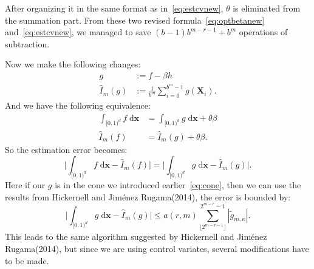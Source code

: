 After organizing it in the same format as in~\eqref{eq:estcvnew}, $\theta$ is eliminated from the summation part. 
From these two revised formula~\eqref{eq:optbetanew} and~\eqref{eq:estcvnew}, we managed to save $(b-1)b^{m-r-1}+b^m$ operations of subtraction.



Now we make the following changes:
\begin{align*}
    g&:=f-\beta h\\ 
    \hat{I}_m({g})&:= \frac{1}{b^m}\sum_{i=0}^{b^m-1}g(\mathbf{X}_i).
\end{align*}
And we have the following equivalence:
\begin{align*}
    \int_{[0,1)^d}f\;\textrm{d}\mathbf{x} &= \int_{[0,1)^d}g\;\textrm{d}\mathbf{x} +\theta\beta\\ 
    \hat{I}_m(f) &= \hat{I}_m(g)+\theta\beta.
\end{align*}
So the estimation error becomes:
\[
    \Big| \int_{[0,1)^d}f\;\textrm{d}\mathbf{x}- \hat{I}_m(f) \Big|
    =\Big| \int_{[0,1)^d}g\;\textrm{d}\mathbf{x}- \hat{I}_m(g) \Big|.
\]
Here if our $g$ is in the cone we introduced earlier~\eqref{eq:cone}, then we can use the results from Hickernell and Jiménez Rugama(2014)\cite{hickernell2014reliable}, the error is bounded by:
\[
\Big|\int_{[0,1)^d}g\;\textrm{d}\mathbf{x} - \hat{I}_m(g)\Big| \leq a(r,m) \sum_{\lfloor 2^{m-r-1} \rfloor}^{2^{m-r}-1} |\tilde{g}_{m,\kappa}|.
\]
This leads to the same algorithm suggested by Hickernell and Jiménez Rugama(2014)\cite{hickernell2014reliable}, but since we are using control variates, several modifications have to be made.


